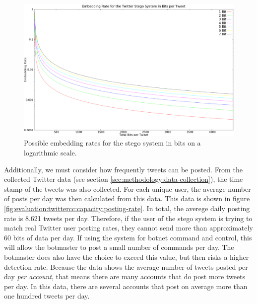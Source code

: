 \begin{figure}
    \centering
    \includegraphics[width=\columnwidth]{embedding-rate.eps}
    \caption{Possible embedding rates for the stego system in bits on a logarithmic scale.}
    \label{fig:evaluation:twittercc:capacity:emebedding-rate}
\end{figure}

Additionally, we must consider how frequently tweets can be posted.  From the
collected Twitter data (see section \ref{sec:methodology:data-collection}),
the time stamp of the tweets was also collected.  For each unique user, the
average number of posts per day was then calculated from this data.  This
data is shown in figure \ref{fig:evaluation:twittercc:capacity:posting-rate}.  In
total, the averege daily posting rate is 8.621 tweets per day.  Therefore, if the
user of the stego system is trying to match real Twitter user posting rates, they
cannot send more than approximately 60 bits of data per day.  If using the system
for botnet command and control, this will allow the botmaster to post a small number
of commands per day.  The botmaster does also have the choice to exceed this
value, but then risks a higher detection rate.  Because the data shows the
average number of tweets posted per day \emph{per account}, that means there
are many accounts that do post more tweets per day.  In this data, there are
several accounts that post on average more than one hundred tweets per day.

